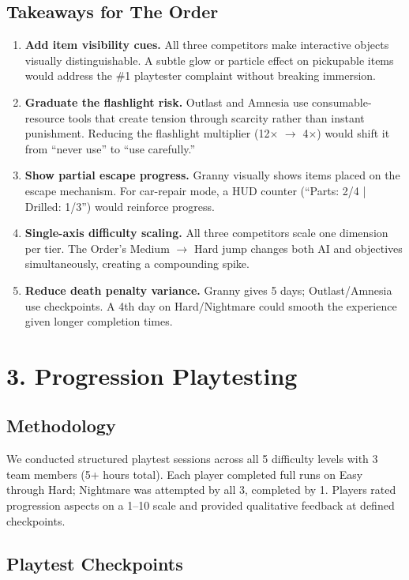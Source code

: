\documentclass[11pt]{article}
\begin{document}
\subsection{Takeaways for The Order}

\begin{enumerate}[nosep]
\item \textbf{Add item visibility cues.} All three competitors make interactive objects visually distinguishable. A subtle glow or particle effect on pickupable items would address the \#1 playtester complaint without breaking immersion.
\item \textbf{Graduate the flashlight risk.} Outlast and Amnesia use consumable-resource tools that create tension through scarcity rather than instant punishment. Reducing the flashlight multiplier (12$\times$ $\to$ 4$\times$) would shift it from ``never use'' to ``use carefully.''
\item \textbf{Show partial escape progress.} Granny visually shows items placed on the escape mechanism. For car-repair mode, a HUD counter (``Parts: 2/4 | Drilled: 1/3'') would reinforce progress.
\item \textbf{Single-axis difficulty scaling.} All three competitors scale one dimension per tier. The Order's Medium $\to$ Hard jump changes both AI and objectives simultaneously, creating a compounding spike.
\item \textbf{Reduce death penalty variance.} Granny gives 5 days; Outlast/Amnesia use checkpoints. A 4th day on Hard/Nightmare could smooth the experience given longer completion times.
\end{enumerate}

\newpage

\section{3. Progression Playtesting}

\subsection{Methodology}

We conducted structured playtest sessions across all 5 difficulty levels with 3 team members (5+ hours total). Each player completed full runs on Easy through Hard; Nightmare was attempted by all 3, completed by 1. Players rated progression aspects on a 1--10 scale and provided qualitative feedback at defined checkpoints.

\subsection{Playtest Checkpoints}
\end{document}
